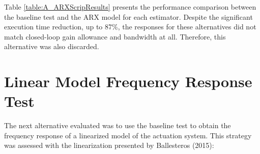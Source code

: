 Table \ref{table:A_ARXScripResults} presents the performance comparison between the baseline test and the ARX model for each estimator. Despite the significant execution time reduction, up to 87\%, the responses for these alternatives did not match closed-loop gain allowance and bandwidth at all. Therefore, this alternative was also discarded.

\section{Linear Model Frequency Response Test}

The next alternative evaluated was to use the baseline test to obtain the frequency response of a linearized model of the actuation system. This strategy was assessed with the linearization presented by Ballesteros (2015):

